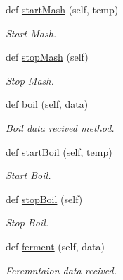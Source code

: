 \begin{DoxyCompactItemize}
def \mbox{\hyperlink{classu_ccoms_1_1_pi_radio_a28563902e7831d23b5eaca2d9b832d7e}{start\+Mash}} (self, temp)
\begin{DoxyCompactList}\small\item\em Start Mash. \end{DoxyCompactList}\item 
def \mbox{\hyperlink{classu_ccoms_1_1_pi_radio_afbacd87b43c6f0b6faff82fc608a7386}{stop\+Mash}} (self)
\begin{DoxyCompactList}\small\item\em Stop Mash. \end{DoxyCompactList}\item 
def \mbox{\hyperlink{classu_ccoms_1_1_pi_radio_a1005053135e020acd9a954190f0b34ec}{boil}} (self, data)
\begin{DoxyCompactList}\small\item\em Boil data recived method. \end{DoxyCompactList}\item 
def \mbox{\hyperlink{classu_ccoms_1_1_pi_radio_a4b28166c3a76316148e953988ef4033b}{start\+Boil}} (self, temp)
\begin{DoxyCompactList}\small\item\em Start Boil. \end{DoxyCompactList}\item 
def \mbox{\hyperlink{classu_ccoms_1_1_pi_radio_aa2f56d29043646663269b11db7d8d6d0}{stop\+Boil}} (self)
\begin{DoxyCompactList}\small\item\em Stop Boil. \end{DoxyCompactList}\item 
def \mbox{\hyperlink{classu_ccoms_1_1_pi_radio_a0a350355ff295c76bb11780aafe38c81}{ferment}} (self, data)
\begin{DoxyCompactList}\small\item\em Feremntaion data recived. \end{DoxyCompactList}\end{DoxyCompactItemize}
